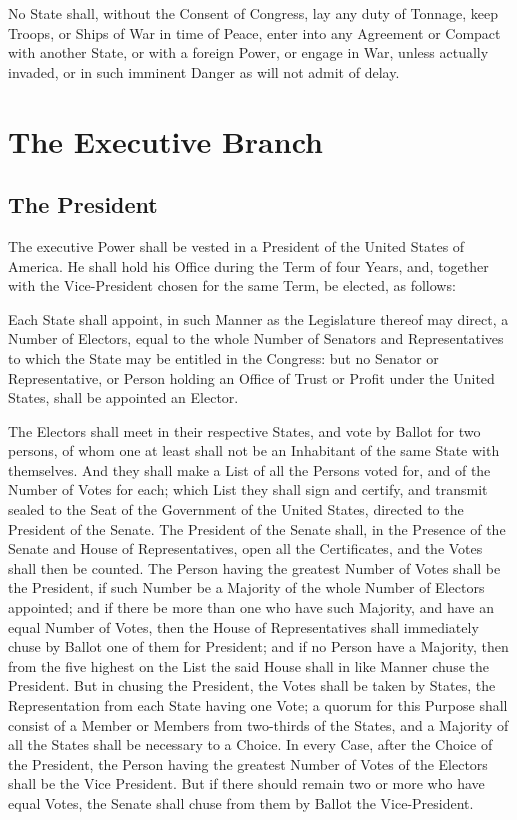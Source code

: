 \documentclass{constitution}
\begin{document}
No State shall, without the Consent of Congress,
lay any duty of Tonnage,
keep Troops, or Ships of War in time of Peace,
enter into any Agreement or Compact with another State, or with a foreign Power,
or engage in War, unless actually invaded,
or in such imminent Danger as will not admit of delay.

\chapter{The Executive Branch}
\section{The President}
The executive Power shall be vested in a President of the United States of America.
He shall hold his Office during the Term of four Years,
and, together with the Vice-President chosen for the same Term,
be elected, as follows:

Each State shall appoint,
in such Manner as the Legislature thereof may direct,
a Number of Electors, equal to the whole Number of Senators and Representatives
to which the State may be entitled in the Congress:
but no Senator or Representative,
or Person holding an Office of Trust or Profit under the United States,
shall be appointed an Elector.

The Electors shall meet in their respective States, and vote by Ballot for two persons,
of whom one at least shall not be an Inhabitant of the same State with themselves.
And they shall make a List of all the Persons voted for, and of the Number of Votes for each;
which List they shall sign and certify,
and transmit sealed to the Seat of the Government of the United States,
directed to the President of the Senate.
The President of the Senate shall,
in the Presence of the Senate and House of Representatives,
open all the Certificates, and the Votes shall then be counted.
The Person having the greatest Number of Votes shall be the President,
if such Number be a Majority of the whole Number of Electors appointed;
and if there be more than one who have such Majority, and have an equal Number of Votes,
then the House of Representatives shall immediately chuse by Ballot one of them for President;
and if no Person have a Majority,
then from the five highest on the List the said House shall in like Manner chuse the President.
But in chusing the President, the Votes shall be taken by States,
the Representation from each State having one Vote;
a quorum for this Purpose shall consist of a Member or Members from two-thirds of the States,
and a Majority of all the States shall be necessary to a Choice.
In every Case, after the Choice of the President,
the Person having the greatest Number of Votes of the Electors shall be the Vice President.
But if there should remain two or more who have equal Votes,
the Senate shall chuse from them by Ballot the Vice-President.
\end{document}
